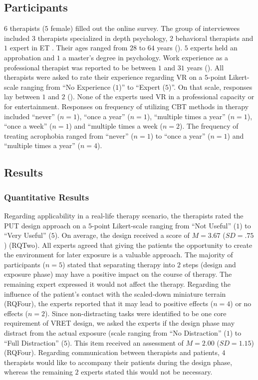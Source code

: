 \subsection{Participants}
$6$ therapists ($5$ female) filled out the online survey. The group of interviewees included $3$ therapists specialized in depth psychology, $2$ behavioral therapists and $1$ expert in \ac{ET}%
. Their ages ranged from $28$ to $64$ years (). $5$ experts held an approbation and $1$ a master's degree in psychology. Work experience as a professional therapist was reported to be between $1$ and $31$ years (). 
All therapists were asked to rate their experience regarding \ac{VR} on a $5$-point Likert-scale ranging from ``No Experience ($1$)'' to ``Expert ($5$)''. On that scale, responses lay between $1$ and $2$ (). 
None of the experts used \ac{VR} in a professional capacity or for entertainment. 
Responses on frequency of utilizing \ac{CBT} methods in therapy included ``never'' ($n{=}1$), ``once a year'' ($n{=}1$), ``multiple times a year'' ($n{=}1$), ``once a week'' ($n{=}1$) and ``multiple times a week ($n{=}2$).
The frequency of treating acrophobia ranged from ``never'' ($n{=}1$) to ``once a year'' ($n{=}1$) and ``multiple times a year'' ($n{=}4$). 

\subsection{Results}

\subsubsection*{Quantitative Results}
Regarding applicability in a real-life therapy scenario, the therapists rated the \ac{PUT} design approach on a $5$-point Likert-scale ranging from ``Not Useful'' ($1$) to ``Very Useful'' ($5$). On average, the design received a score of $M{=}3.67$ ($SD{=}.75$) (\acl{RQTwo}). All experts agreed that giving the patients the opportunity to create the environment for later exposure is a valuable approach. The majority of participants ($n{=}5$) stated that separating therapy into $2$ steps (design and exposure phase) may have a positive impact on the course of therapy. The remaining expert expressed it would not affect the therapy. 
Regarding the influence of the patient's contact with the scaled-down miniature terrain (\acl{RQFour}), the experts reported that it may lead to positive effects ($n{=}4$) or no effects ($n{=}2$). 
Since non-distracting tasks were identified to be one core requirement of \ac{VRET} design, we asked the experts if the design phase may distract from the actual exposure (scale ranging from ``No Distraction''  ($1$) to ``Full Distraction'' ($5$). 
This item received an assessment of $M{=}2.00$ ($SD{=}1.15$) (\acl{RQFour}). 
Regarding communication between therapists and patients, $4$ therapists would like to accompany their patients during the design phase, whereas the remaining $2$ experts stated this would not be necessary. 


